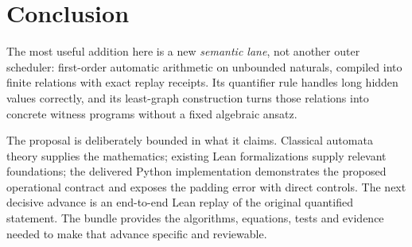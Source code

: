 \section{Conclusion}
The most useful addition here is a new \emph{semantic lane}, not another outer scheduler: first-order automatic arithmetic on unbounded naturals, compiled into finite relations with exact replay receipts. Its quantifier rule handles long hidden values correctly, and its least-graph construction turns those relations into concrete witness programs without a fixed algebraic ansatz.

The proposal is deliberately bounded in what it claims. Classical automata theory supplies the mathematics; existing Lean formalizations supply relevant foundations; the delivered Python implementation demonstrates the proposed operational contract and exposes the padding error with direct controls. The next decisive advance is an end-to-end Lean replay of the original quantified statement. The bundle provides the algorithms, equations, tests and evidence needed to make that advance specific and reviewable.
